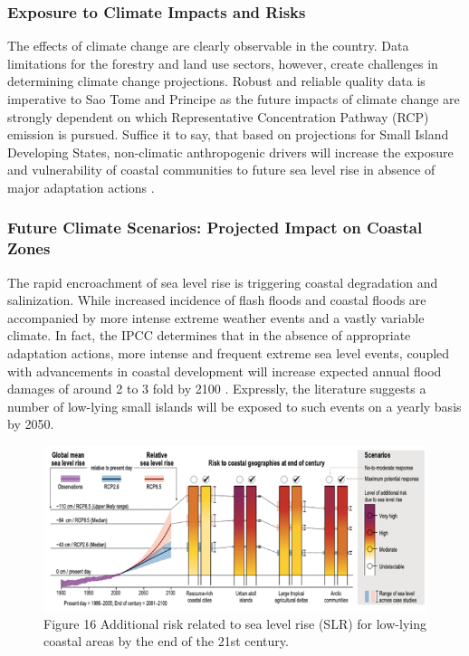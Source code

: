 \documentclass[
]{book}
\begin{document}
\hypertarget{exposure-to-climate-impacts-and-risks-6}{%
\subsubsection{Exposure to Climate Impacts and Risks}\label{exposure-to-climate-impacts-and-risks-6}}

The effects of climate change are clearly observable in the country. Data limitations for the forestry and land use sectors, however, create challenges in determining climate change projections. Robust and reliable quality data is imperative to Sao Tome and Principe as the future impacts of climate change are strongly dependent on which Representative Concentration Pathway (RCP) emission is pursued. Suffice it to say, that based on projections for Small Island Developing States, non-climatic anthropogenic drivers will increase the exposure and vulnerability of coastal communities to future sea level rise in absence of major adaptation actions .

\hypertarget{future-climate-scenarios-projected-impact-on-coastal-zones}{%
\subsubsection{Future Climate Scenarios: Projected Impact on Coastal Zones}\label{future-climate-scenarios-projected-impact-on-coastal-zones}}

The rapid encroachment of sea level rise is triggering coastal degradation and salinization. While increased incidence of flash floods and coastal floods are accompanied by more intense extreme weather events and a vastly variable climate. In fact, the IPCC determines that in the absence of appropriate adaptation actions, more intense and frequent extreme sea level events, coupled with advancements in coastal development will increase expected annual flood damages of around 2 to 3 fold by 2100 . Expressly, the literature suggests a number of low-lying small islands will be exposed to such events on a yearly basis by 2050.

\begin{figure}
\centering
\includegraphics{images/sealevel_rise.png}
\caption{Figure 16 Additional risk related to sea level rise (SLR) for low-lying coastal areas by the end of the 21st century.}
\end{figure}
\end{document}
